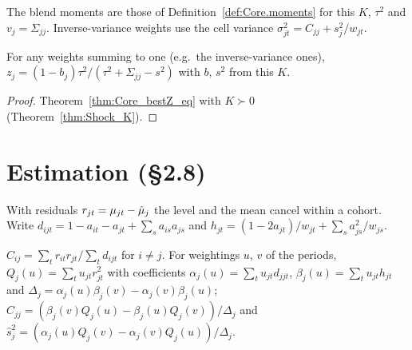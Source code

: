 \begin{definition}\label{def:Shock_moments}
  \leanok
  The blend moments are those of Definition~\ref{def:Core.moments} for this $K$, $\tau^2$
  and $v_j = \Sigma_{jj}$. Inverse-variance weights  use the cell variance
  $\sigma_{jt}^2 = C_{jj} + s_j^2/w_{jt}$.
\end{definition}

\begin{corollary}\label{cor:Shock_bestZ}
  \leanok
  For any weights summing to one (e.g.\ the inverse-variance ones),
  $z_j = (1 - b_j)\tau^2/(\tau^2 + \Sigma_{jj} - s^2)$ with $b$, $s^2$ from this $K$.
\end{corollary}
\begin{proof}
  \leanok
  Theorem~\ref{thm:Core_bestZ_eq} with $K \succ 0$ (Theorem~\ref{thm:Shock_K}).
\end{proof}

\section*{Estimation (\S2.8)}

With residuals $r_{jt} = \mu_{jt} - \hat\mu_j$ the level and the mean cancel within a cohort.
Write $d_{ijt} = 1 - a_{it} - a_{jt} + \sum_s a_{is}a_{js}$ and
$h_{jt} = (1 - 2a_{jt})/w_{jt} + \sum_s a_{js}^2/w_{js}$.

\begin{definition}\label{def:Shock_estimators}
  \leanok
  $\hat C_{ij} = \sum_t r_{it}r_{jt}/\sum_t d_{ijt}$ for $i \ne j$. For weightings $u$, $v$
  of the periods, $Q_j(u) = \sum_t u_{jt}r_{jt}^2$ with coefficients
  $\alpha_j(u) = \sum_t u_{jt}d_{jjt}$, $\beta_j(u) = \sum_t u_{jt}h_{jt}$ and
  $\Delta_j = \alpha_j(u)\beta_j(v) - \alpha_j(v)\beta_j(u)$;
  $\hat C_{jj} = (\beta_j(v)Q_j(u) - \beta_j(u)Q_j(v))/\Delta_j$ and
  $\hat s_j^2 = (\alpha_j(u)Q_j(v) - \alpha_j(v)Q_j(u))/\Delta_j$.
\end{definition}

